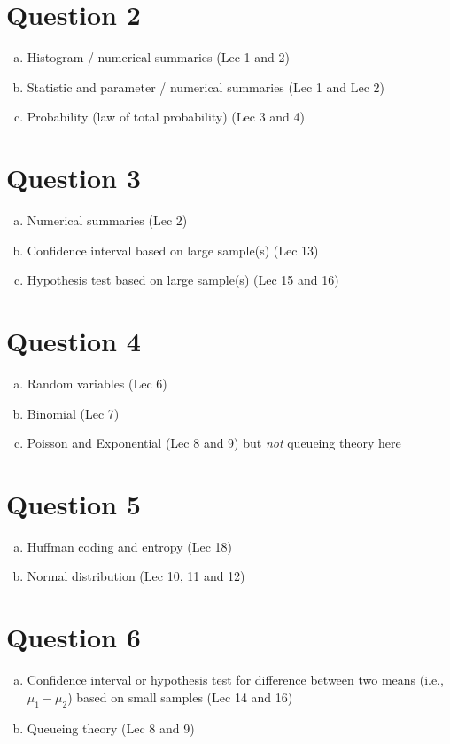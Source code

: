 \documentclass[12pt]{article}
\begin{document}
\section*{Question 2}
\begin{enumerate}[a)]
\item Histogram / numerical summaries (Lec 1 and 2)
\item Statistic and parameter / numerical summaries (Lec 1 and Lec 2)
\item Probability (law of total probability) (Lec 3 and 4)
\end{enumerate}

\section*{Question 3}
\begin{enumerate}[a)]
\item Numerical summaries (Lec 2)
\item Confidence interval based on large sample(s) (Lec 13)
\item Hypothesis test based on large sample(s) (Lec 15 and 16)
\end{enumerate}

\section*{Question 4}
\begin{enumerate}[a)]
\item Random variables (Lec 6)
\item Binomial (Lec 7)
\item Poisson and Exponential (Lec 8 and 9) but \emph{not} queueing theory here
\end{enumerate}


\section*{Question 5}
\begin{enumerate}[a)]
\item Huffman coding and entropy (Lec 18)
\item Normal distribution (Lec 10, 11 and 12)
\end{enumerate}


\section*{Question 6}
\begin{enumerate}[a)]
\item Confidence interval or hypothesis test for difference between two means (i.e., $\mu_1-\mu_2$) based on small samples (Lec 14 and 16)
\item Queueing theory (Lec 8 and 9)
\end{enumerate}
\end{document}
